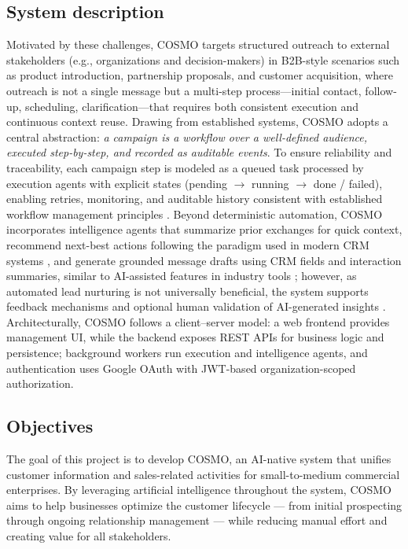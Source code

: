 \documentclass[a4paper]{article}
\begin{document}
\subsection{System description}
Motivated by these challenges, COSMO targets structured outreach to 
external stakeholders (e.g., organizations and decision-makers) in 
B2B-style scenarios such as product introduction, partnership 
proposals, and customer acquisition, where outreach is not a single 
message but a multi-step process—initial contact, follow-up, 
scheduling, clarification—that requires both consistent execution 
and continuous context reuse. Drawing from established systems, COSMO 
adopts a central abstraction: \emph{a campaign is a workflow over a 
well-defined audience, executed step-by-step, and recorded as 
auditable events}. To ensure reliability and traceability, each 
campaign step is modeled as a queued task processed by execution 
agents with explicit states  (pending $\to$ running $\to$ done / failed), enabling retries, monitoring, and 
auditable history consistent with established workflow management 
principles \cite{dasilva2017wfms}. Beyond deterministic automation, 
COSMO incorporates intelligence agents that summarize prior exchanges 
for quick context, recommend next-best actions following the paradigm 
used in modern CRM systems \cite{salesforce_nba_about}, and generate 
grounded message drafts using CRM fields and interaction summaries, 
similar to AI-assisted features in industry tools 
\cite{hubspot_ai_email_creation,ms_d365_copilot_overview}; however, 
as automated lead nurturing is not universally beneficial, the system 
supports feedback mechanisms and optional human validation of 
AI-generated insights \cite{habel2025aln}. Architecturally, COSMO 
follows a client--server model: a web frontend provides management UI, 
while the backend exposes REST APIs for business logic and persistence; 
background workers run execution and intelligence agents, and 
authentication uses Google OAuth with JWT-based organization-scoped 
authorization.


\subsection{Objectives}

The goal of this project is to develop COSMO, an AI-native 
system  that unifies customer information and sales-related activities 
for small-to-medium commercial enterprises. By leveraging artificial 
intelligence throughout the system, COSMO aims to help businesses 
optimize the customer lifecycle --- from initial prospecting through 
ongoing relationship management --- while reducing manual effort and 
creating value for all stakeholders.
\end{document}
